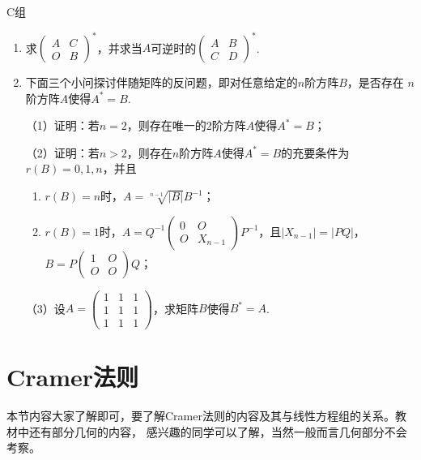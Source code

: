 \centerline{\heiti C组}
\begin{enumerate}
	\item 求$\begin{pmatrix}
		A & C \\ O & B
	\end{pmatrix}^*$，并求当$A$可逆时的$\begin{pmatrix}
		A & B \\ C & D
	\end{pmatrix}^*$.
	\item 下面三个小问探讨伴随矩阵的反问题，即对任意给定的$n$阶方阵$B$，是否存在
	$n$阶方阵$A$使得$A^*=B$.

	（1）证明：若$n=2$，则存在唯一的2阶方阵$A$使得$A^*=B$；

	（2）证明：若$n > 2$，则存在$n$阶方阵$A$使得$A^*=B$的充要条件为$r(B)=0,1,n$，并且
	\begin{enumerate}
		\item $r(B)=n$时，$A=\sqrt[n-1]{|B|}B^{-1}$；
		\item $r(B)=1$时，$A=Q^{-1}\begin{pmatrix}
			0 & O \\ O & X_{n-1}
		\end{pmatrix}P^{-1}$，且$|X_{n-1}|=|PQ|$，$B=P\begin{pmatrix}
			1 & O \\ O & O
		\end{pmatrix}Q$；
	\end{enumerate}

	（3）设$A=\begin{pmatrix}
		1 & 1 & 1 \\ 1 & 1 & 1 \\ 1 & 1 & 1
	\end{pmatrix}$，求矩阵$B$使得$B^*=A$.
\end{enumerate}

\section{Cramer法则}
本节内容大家了解即可，要了解Cramer法则的内容及其与线性方程组的关系。教材中还有部分几何的内容，
感兴趣的同学可以了解，当然一般而言几何部分不会考察。
